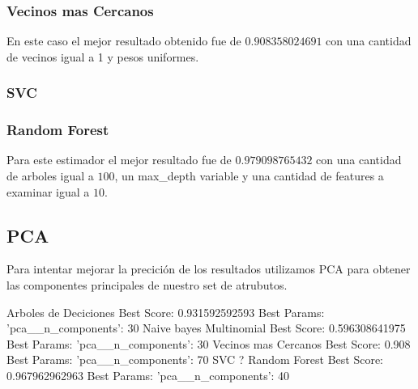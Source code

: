 \subsubsection{Vecinos mas Cercanos}


En este caso el mejor resultado obtenido fue de $0.908358024691$ con una cantidad de vecinos igual a 1 y pesos uniformes.


\subsubsection{SVC}


\subsubsection{Random Forest}


Para este estimador el mejor resultado fue de $0.979098765432$ con una cantidad de arboles igual a $100$, un max_depth variable y una cantidad de features a examinar igual a $10$.


\subsection{PCA}

Para intentar mejorar la precición de los resultados utilizamos PCA para obtener las componentes principales de nuestro set de atrubutos.


Arboles de Deciciones
Best Score: 0.931592592593 Best Params: {'pca__n_components': 30}
Naive bayes Multinomial
Best Score: 0.596308641975 Best Params: {'pca__n_components': 30}
Vecinos mas Cercanos
Best Score: 0.908 Best Params: {'pca__n_components': 70}
SVC
?
Random Forest
Best Score: 0.967962962963 Best Params: {'pca__n_components': 40}
